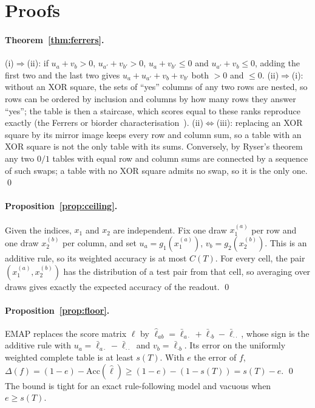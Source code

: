 \section{Proofs}
\label{sup:proofs}

\paragraph{Theorem~\ref{thm:ferrers}.}
(i)$\Rightarrow$(ii): if $u_a+v_b>0$, $u_{a'}+v_{b'}>0$, $u_a+v_{b'}\le 0$ and $u_{a'}+v_b\le 0$,
adding the first two and the last two gives $u_a+u_{a'}+v_b+v_{b'}$ both $>0$ and $\le 0$.
(ii)$\Rightarrow$(i): without an XOR square, the sets of ``yes'' columns of any two rows are
nested, so rows can be ordered by inclusion and columns by how many rows they answer ``yes'';
the table is then a staircase, which scores equal to these ranks reproduce exactly
(the Ferrers or biorder characterisation~\cite{ducamp1969composite,doignon1984realizable}).
(ii)$\Leftrightarrow$(iii): replacing an XOR square by its mirror image keeps every row and
column sum, so a table with an XOR square is not the only table with its sums. Conversely, by
Ryser's theorem~\cite{ryser1957combinatorial} any two $0/1$ tables with equal row and column
sums are connected by a sequence of such swaps; a table with no XOR square admits no swap, so
it is the only one. \qed

\paragraph{Proposition~\ref{prop:ceiling}.}
Given the indices, $x_1$ and $x_2$ are independent. Fix one draw $x_1^{(a)}$ per row and one
draw $x_2^{(b)}$ per column, and set $u_a=g_1(x_1^{(a)})$, $v_b=g_2(x_2^{(b)})$. This is an
additive rule, so its weighted accuracy is at most $C(T)$. For every cell, the pair
$(x_1^{(a)},x_2^{(b)})$ has the distribution of a test pair from that cell, so averaging over
draws gives exactly the expected accuracy of the readout. \qed

\paragraph{Proposition~\ref{prop:floor}.}
EMAP replaces the score matrix $\ell$ by $\hat\ell_{ab}=\bar\ell_{a\cdot}+\bar\ell_{\cdot b}-\bar\ell_{\cdot\cdot}$,
whose sign is the additive rule with $u_a=\bar\ell_{a\cdot}-\bar\ell_{\cdot\cdot}$ and
$v_b=\bar\ell_{\cdot b}$. Its error on the uniformly weighted complete table is at least $s(T)$.
With $e$ the error of $f$, $\Delta(f)=(1-e)-\mathrm{Acc}(\hat\ell)\ge(1-e)-(1-s(T))=s(T)-e$. \qed
The bound is tight for an exact rule-following model and vacuous when $e\ge s(T)$.

